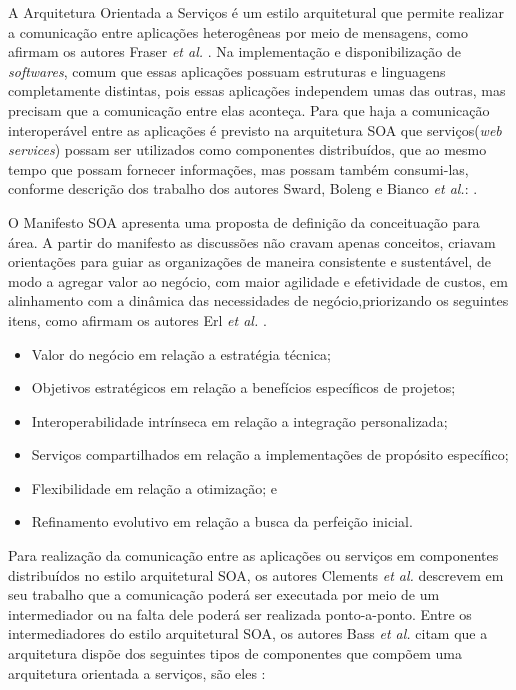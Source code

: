 A Arquitetura Orientada a Serviços é um estilo arquitetural que permite realizar a comunicação entre aplicações heterogêneas por meio de mensagens, como afirmam os autores Fraser \textit{et al.} \cite{fraser2007service}. Na implementação e disponibilização de \textit{softwares}, comum que essas aplicações possuam estruturas e linguagens completamente distintas, pois essas aplicações independem umas das outras, mas precisam que a comunicação entre elas aconteça. Para que haja a comunicação interoperável entre as aplicações é previsto na arquitetura \acrshort{SOA} que serviços(\textit{web services}) possam ser utilizados como componentes distribuídos, que ao mesmo tempo que possam fornecer informações, mas possam também consumi-las, conforme descrição dos trabalho dos autores Sward,  Boleng e Bianco \textit{et al.}: \cite{sward2011service,bianco2011architecting}.

O Manifesto \acrshort{SOA} apresenta uma proposta de definição da conceituação para área. A partir do manifesto as discussões não cravam apenas conceitos, criavam orientações para guiar as organizações de maneira consistente e sustentável, de modo a agregar valor ao negócio, com maior agilidade e efetividade de custos, em alinhamento com a dinâmica das necessidades de negócio,priorizando os seguintes itens, como afirmam os autores Erl \textit{et al.} \cite{erl2009soa}.

\begin{itemize}

\item Valor do negócio em relação a estratégia técnica;

\item Objetivos estratégicos em relação a benefícios específicos de projetos;

\item Interoperabilidade intrínseca em relação a integração personalizada;

\item Serviços compartilhados em relação a implementações de propósito específico;

\item Flexibilidade em relação a otimização; e

\item Refinamento evolutivo em relação a busca da perfeição inicial.

\end{itemize}

Para realização da comunicação entre as aplicações ou serviços em componentes distribuídos no estilo arquitetural \acrshort{SOA}, os autores Clements \textit{et al.}  \cite{clements2002documenting} descrevem em seu trabalho que a comunicação poderá ser executada por meio de um intermediador ou na falta dele poderá ser realizada ponto-a-ponto. Entre os intermediadores do estilo arquitetural \acrshort{SOA}, os autores Bass \textit{et al.} \cite{bass2003software} citam que a arquitetura dispõe dos seguintes tipos de componentes que compõem uma arquitetura orientada a serviços, são eles :

